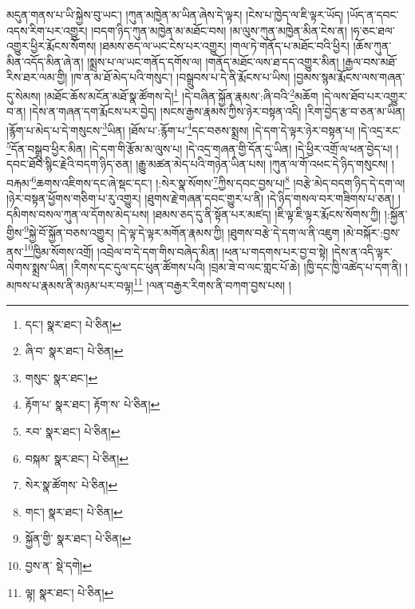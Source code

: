 མདུན་གནས་པ་ཡི་སྐྱེས་བུ་ཡང་། །ཀུན་མཁྱེན་མ་ཡིན་ཞེས་དེ་ལྟར། །ངེས་པ་ཁྱེད་ལ་ཇི་ལྟར་ཡོད། །ཡོད་ན་དབང་འདས་རིག་པར་འགྱུར། །བདག་ཉིད་ཀུན་མཁྱེན་མ་མཐོང་བས། །མ་ལུས་ཀུན་མཁྱེན་མིན་ངེས་ན། །ཧ་ཅང་ཐལ་འགྱུར་ཕྱིར་རྨོངས་སོགས། །ཐམས་ཅད་ལ་ཡང་ངེས་པར་འགྱུར། །གལ་ཏེ་གནོད་པ་མཐོང་བའི་ཕྱིར། །ཆོས་ཀུན་མིན་འདོད་མིན་ཞེ་ན། །སྨྲས་པ་ལ་ཡང་གནོད་དགོས་ལ། །གནོད་མཐོང་ལས་ཐ་དད་འགྱུར་མིན། །རྒྱལ་བས་མཐོ་རིས་ཐར་ལམ་གྱི། །ཁ་ན་མ་ཐོ་མེད་པའི་གསུང་། །བསྒྲུབས་པ་དེ་ནི་རྨོངས་པ་ཡིས། །བྱམས་སྙམ་རྨོངས་ལས་གཞན་དུ་སེམས། །མཐོང་ཆོས་མངོན་མཐོ་སྣ་ཚོགས་དེ།\footnote{དང་།  སྣར་ཐང་།  པེ་ཅིན། } །དེ་བཞིན་སྐྱོན་རྣམས་:ཞི་བའི་\footnote{ཞི་བ་  སྣར་ཐང་།  པེ་ཅིན། }མཆོག །དེ་ལས་ཐོབ་པར་འགྱུར་བ་ན། །དེས་ན་གཞན་དག་རྨོངས་པར་བྱེད། །སངས་རྒྱས་རྣམས་ཀྱིས་ཉེར་བསྟན་འདི། །རིག་བྱེད་རྩ་བ་ཅན་མ་ཡིན། །རྙོག་པ་མེད་པ་དེ་གསུངས་\footnote{གསུང་  སྣར་ཐང་། }ཡིན། །ཐོས་པ་:རྙོག་པ་\footnote{རྟོག་པ་  སྣར་ཐང་། རྟོག་ས་  པེ་ཅིན། }དང་བཅས་སྨྲས། །དེ་དག་དེ་ལྟར་ཉེར་བསྟན་པ། །དེ་འདྲ་རང་\footnote{རབ་  སྣར་ཐང་།  པེ་ཅིན། }དོན་བསྒྲུབ་ཕྱིར་མིན། །དེ་དག་གི་རྩོམ་མ་ལུས་པ། །དེ་འདྲ་གཞན་གྱི་དོན་དུ་ཡིན། །དེ་ཕྱིར་འགྲོ་ལ་ཕན་བྱེད་པ། །དབང་ཐོབ་སྙིང་རྗེའི་བདག་ཉིད་ཅན། །རྒྱུ་མཚན་མེད་པའི་གཉེན་ཡིན་པས། །ཀུན་ལ་གོ་འཕང་དེ་ཉིད་གསུངས། །བརྐམ་\footnote{བསྐམ་  སྣར་ཐང་།  པེ་ཅིན། }ཆགས་འཇིགས་དང་ཞེ་སྡང་དང་། །:སེར་སྣ་སོགས་\footnote{སེར་སྣ་ཚོགས་  པེ་ཅིན། }ཀྱིས་དབང་བྱས་པ།\footnote{གང་།  སྣར་ཐང་།  པེ་ཅིན། } །བརྩེ་མེད་བདག་ཉིད་དེ་དག་ལ། །ཉེར་བསྟན་ཕྱོགས་གཅིག་པ་རུ་འགྱུར། །ཐུགས་རྗེ་གཞན་དབང་གྱུར་པ་ནི། །དེ་ཉིད་གསལ་བར་གཟིགས་པ་ཅན། །དམིགས་བསལ་ཀུན་ལ་དོགས་མེད་པས། །ཐམས་ཅད་དུ་ནི་སྟོན་པར་མཛད། །ཇི་ལྟ་ཇི་ལྟར་རྨོངས་སོགས་ཀྱི། །:སྐྱོན་གྱིས་\footnote{སྐྱོན་གྱི་  སྣར་ཐང་།  པེ་ཅིན། }སྐྱེ་བོ་སྐྱོན་བཅས་འགྱུར། །དེ་ལྟ་དེ་ལྟར་མགོན་རྣམས་ཀྱི། །ཐུགས་བརྩེ་དེ་དག་ལ་ནི་འཇུག །མེ་བསྐོར་:བྱས་ནས་\footnote{བྱས་ན་  སྡེ་དགེ། }ཁྱིམ་སོགས་འགྲོ། །འབྲེལ་བ་དེ་དག་གིས་བཞེད་མིན། །ཕན་པ་གདགས་པར་བྱ་བ་སྟེ། །དེས་ན་འདི་ལྟར་ལེགས་སྨྲས་ཡིན། །རིགས་དང་དུལ་དང་ཕུན་ཚོགས་པའི། །བྲམ་ཟེ་བ་ལང་གླང་པོ་ཆེ། །ཁྱི་དང་ཁྱི་འཚེད་པ་དག་ནི། །མཁས་པ་རྣམས་ནི་མཉམ་པར་བལྟ།\footnote{ལྟ།  སྣར་ཐང་།  པེ་ཅིན། } །ལན་བརྒྱར་རིགས་ནི་བཀག་བྱས་པས། །
